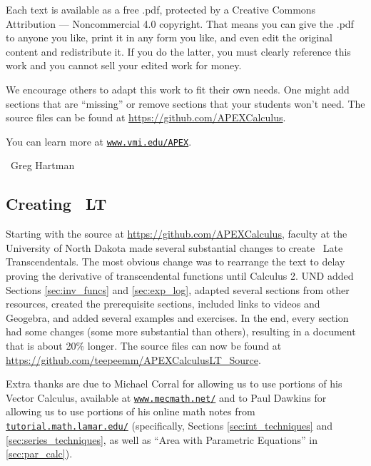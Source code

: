 \begin{itemize}
\begin{itemize}
Each text is available as a free .pdf, protected by a Creative Commons Attribution --- Noncommercial 4.0 copyright. That means you can give the .pdf to anyone you like, print it in any form you like, and even edit the original content and redistribute it. If you do the latter, you must clearly reference this work and you cannot sell your edited work for money.

We encourage others to adapt this work to fit their own needs. One might add sections that are ``missing'' or remove sections that your students won't need. The source files can be found at \url{https://github.com/APEXCalculus}.

You can learn more at \texttt{\href{http://www.vmi.edu/APEX}{www.vmi.edu/APEX}}.

~\hfill Greg Hartman

\subsection*{Creating \apex~LT}

Starting with the source at \url{https://github.com/APEXCalculus},
faculty at the University of North Dakota made several substantial changes to create \apex\ Late Transcendentals.  The most obvious change was to rearrange the text to delay proving the derivative of transcendental functions until Calculus 2.  UND added Sections \ref{sec:inv_funcs} and \ref{sec:exp_log}, adapted several sections from other resources, created the prerequisite sections, included links to videos and Geogebra, and added several examples and exercises.  In the end, every section had some changes (some more substantial than others), resulting in a document that is about 20\% longer. The source files can now be found at\iflatexml\else\\\fi
\url{https://github.com/teepeemm/APEXCalculusLT_Source}.

Extra thanks are due
to Michael Corral for allowing us to use portions of his Vector Calculus, available at \texttt{\href{http://www.mecmath.net/}{www.mecmath.net/}}
and
to Paul Dawkins for allowing us to use portions of his online math notes from \texttt{\href{http://tutorial.math.lamar.edu/}{tutorial.math.lamar.edu/}} (specifically, Sections \ref{sec:int_techniques} and \ref{sec:series_techniques}, as well as ``Area with Parametric Equations'' in \autoref{sec:par_calc}).


\end{itemize}
\end{itemize}

